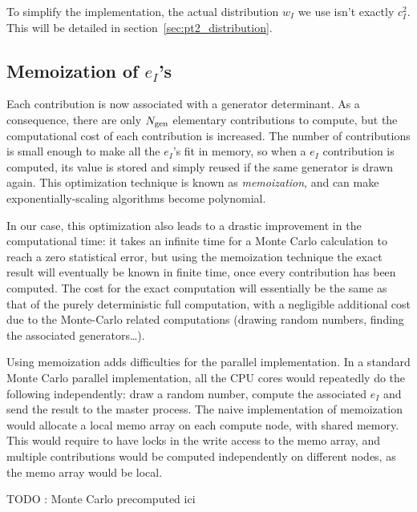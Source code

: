 \documentclass[./thesis.tex]{subfiles}
\begin{document}
To simplify the implementation, the actual distribution $w_I$ we use isn't exactly $c_I^2$. This will be detailed in section~\ref{sec:pt2_distribution}.



\subsection{Memoization of $e_I$'s}

Each contribution is now associated with a generator determinant. As a consequence, there are only ${N_\text{gen}}$ elementary contributions to compute, but the computational cost of each contribution is increased.
The number of contributions is small enough to make all the $e_I$'s fit in memory, so when a $e_I$ contribution is computed, its value is stored and simply reused if the same generator is drawn again. This optimization technique is known as \emph{memoization},\cite{Michie1968Apr} and can make exponentially-scaling algorithms become polynomial.\cite{Frost1994}

In our case, this optimization also leads to a drastic improvement in the computational time: it takes an infinite time for a Monte Carlo calculation to reach a zero statistical error, but using the memoization technique the exact result will eventually be known in finite time, once every contribution has been computed. The cost for the exact computation will essentially be the same as that of the purely deterministic full computation, with a negligible additional cost due to the Monte-Carlo related computations (drawing random numbers, finding the associated generators\dots).

Using memoization adds difficulties for the parallel implementation.
In a standard Monte Carlo parallel implementation,
all the CPU cores would repeatedly do the following independently: 
draw a random number, compute the associated $e_I$ and send the result to the master process.
The naive implementation of memoization would allocate a local memo array on each compute node, with shared memory. This would require to have locks in the write access to the memo array, and multiple contributions would be computed independently on different nodes, as the memo array would be local.

\alert{TODO : Monte Carlo precomputed ici}
\end{document}
